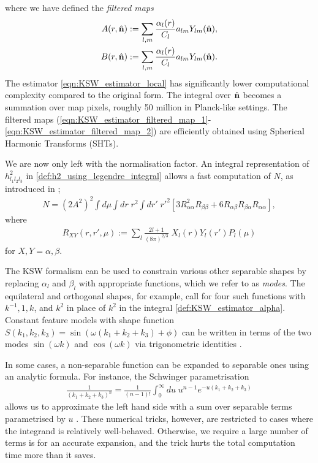 where we have defined the \textit{filtered maps}
\begin{align}
	A(r,\hat{\mathbf{n}}) &:= \sum_{l,m} \frac{\alpha_l(r)}{C_l} a_{lm} Y_{lm}(\hat{\mathbf{n}}), \label{eqn:KSW_estimator_filtered_map_1}\\
	B(r,\hat{\mathbf{n}}) &:= \sum_{l,m} \frac{\alpha_l(r)}{C_l} a_{lm} Y_{lm}(\hat{\mathbf{n}}). \label{eqn:KSW_estimator_filtered_map_2}
\end{align}
The estimator \eqref{eqn:KSW_estimator_local} has significantly lower computational complexity compared to the original form. The integral over $\hat{\mathbf{n}}$ becomes a summation over map pixels, roughly 50 million in Planck-like settings. The filtered maps (\ref{eqn:KSW_estimator_filtered_map_1}-\ref{eqn:KSW_estimator_filtered_map_2}) are efficiently obtained using Spherical Harmonic Transforms (SHTs).

We are now only left with the normalisation factor. An integral representation of $h^2_{l_1 l_2 l_3}$ in \eqref{def:h2_using_legendre_integral} allows a fast computation of $N$, as introduced in \cite{Smith2011};
\begin{align}
	N = (2A^2)^2 \int d\mu \int dr \;r^2 \int dr' \; r'^2 \left[ 3R_{\alpha\alpha}^2 R_{\beta\beta} + 6R_{\alpha\beta} R_{\beta\alpha} R_{\alpha\alpha} \right],
\end{align}
where
\begin{align}
	R_{XY} (r,r',\mu) := \sum_l \frac{2l+1}{(8\pi)^{2/3}} \; X_l (r) Y_l (r') P_l(\mu)
\end{align}
for $X,Y=\alpha,\beta$.

The KSW formalism can be used to constrain various other separable shapes by replacing $\alpha_l$ and $\beta_l$ with appropriate functions, which we refer to as \textit{modes}. The equilateral and orthogonal shapes, for example, call for four such functions with $k^{-1}, 1, k$, and $k^2$ in place of $k^2$ in the integral \eqref{def:KSW_estimator_alpha}. Constant feature models with shape function $S(k_1,k_2,k_3) = \sin(\omega(k_1+k_2+k_3)+\phi)$ can be written in terms of the two modes $\sin(\omega k)$ and $\cos(\omega k)$ via trigonometric identities \cite{Munchmeyer2014}.

In some cases, a non-separable function can be expanded to separable ones using an analytic formula. For instance, the Schwinger parametrisation
\begin{align}
	\frac{1}{(k_1+k_2+k_3)^n} = \frac{1}{(n-1)!} \int_0^{\infty} du \; u^{n-1} e^{-u(k_1+k_2+k_3)}
\end{align}
allows us to approximate the left hand side with a sum over separable terms parametrised by $u$ \cite{Smith2011}. These numerical tricks, however, are restricted to cases where the integrand is relatively well-behaved. Otherwise, we require a large number of terms is for an accurate expansion, and the trick hurts the total computation time more than it saves.

